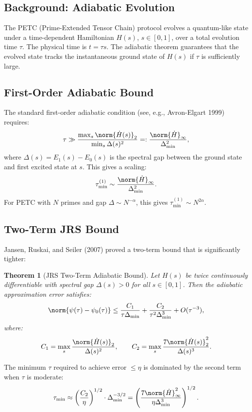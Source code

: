 \documentclass[11pt,letterpaper]{article}
\theoremstyle{pirtmthm}
\newtheorem{theorem}{Theorem}[section]
\theoremstyle{remark}
\begin{document}
\subsection{Background: Adiabatic Evolution}

The PETC (Prime-Extended Tensor Chain) protocol evolves a quantum-like
state under a time-dependent Hamiltonian $H(s)$, $s \in [0,1]$,
over a total evolution time $\tau$. The physical time is $t = \tau s$.
The adiabatic theorem guarantees that the evolved state tracks the
instantaneous ground state of $H(s)$ if $\tau$ is sufficiently large.

\subsection{First-Order Adiabatic Bound}

The standard first-order adiabatic condition (see, e.g., Avron-Elgart 1999)
requires:
\[
  \tau \gg \frac{\max_s \norm{\dot{H}(s)}_2}{\min_s \Delta(s)^2}
  =: \frac{\norm{\dot{H}}_\infty}{\Delta_{\min}^2},
\]
where $\Delta(s) = E_1(s) - E_0(s)$ is the spectral gap between the
ground state and first excited state at $s$. This gives a scaling:
\[
  \tau_{\min}^{(1)} \sim \frac{\norm{\dot{H}}_\infty}{\Delta_{\min}^2}.
\]
For PETC with $N$ primes and gap $\Delta \sim N^{-\alpha}$, this gives
$\tau_{\min}^{(1)} \sim N^{2\alpha}$.

\subsection{Two-Term JRS Bound}

Jansen, Ruskai, and Seiler (2007) proved a two-term bound that is
significantly tighter:

\begin{theorem}[JRS Two-Term Adiabatic Bound]
\label{thm:A-jrs}
Let $H(s)$ be twice continuously differentiable with spectral gap
$\Delta(s) > 0$ for all $s \in [0,1]$. Then the adiabatic approximation
error satisfies:
\[
  \norm{\psi(\tau) - \psi_0(\tau)} \leq \frac{C_1}{\tau \Delta_{\min}}
  + \frac{C_2}{\tau^2 \Delta_{\min}^3}
  + O(\tau^{-3}),
\]
where:
\[
  C_1 = \max_s \frac{\norm{\dot{H}(s)}_2}{\Delta(s)^2}, \qquad
  C_2 = \max_s \frac{7\norm{\dot{H}(s)}_2^2}{\Delta(s)^3}.
\]
\end{theorem}

The minimum $\tau$ required to achieve error $\leq \eta$ is dominated
by the second term when $\tau$ is moderate:
\begin{equation}
  \tau_{\min} \approx \left(\frac{C_2}{\eta}\right)^{1/2} \cdot \Delta_{\min}^{-3/2}
  = \left(\frac{7\norm{\dot{H}}^2_\infty}{\eta \Delta_{\min}^3}\right)^{1/2}.
  \label{eq:A-jrs-bound}
\end{equation}
\end{document}
